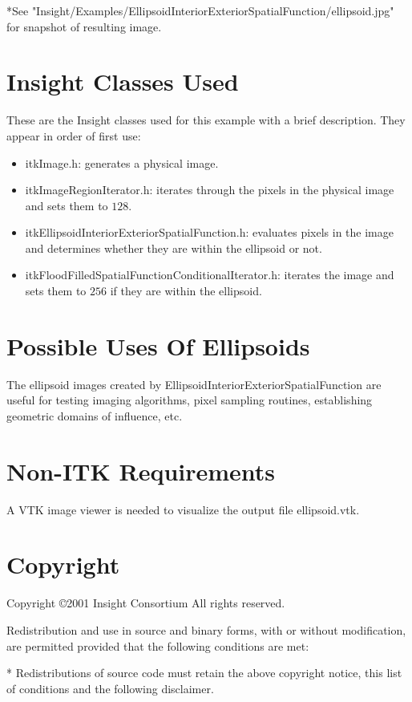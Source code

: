\documentclass{InsightHowto}
\begin{document}
*See "Insight/Examples/EllipsoidInteriorExteriorSpatialFunction/ellipsoid.jpg" for snapshot
of resulting image.

\section{Insight Classes Used}

These are the Insight classes used for this example with a brief description. They appear in
order of first use:

\begin{itemize}
\item itkImage.h: generates a physical image.
\item itkImageRegionIterator.h: iterates through the pixels in the physical image and sets
them to $128$.
\item itkEllipsoidInteriorExteriorSpatialFunction.h: evaluates pixels in the image and determines whether they are within the ellipsoid or
not.
\item itkFloodFilledSpatialFunctionConditionalIterator.h: iterates the image and sets them to $256$ if they are within the
ellipsoid.
\end{itemize}

\section{Possible Uses Of Ellipsoids}
The ellipsoid images created by EllipsoidInteriorExteriorSpatialFunction are useful for
testing imaging algorithms, pixel sampling routines, establishing geometric domains of
influence, etc.

\section{Non-ITK Requirements}
A VTK image viewer is needed to visualize the output file ellipsoid.vtk.

\section{Copyright}
Copyright \copyright 2001 Insight Consortium All rights reserved.

Redistribution and use in source and binary forms, with or without modification, are
permitted provided that the following conditions are met:

 * Redistributions of source code must retain the above copyright notice,
   this list of conditions and the following disclaimer.
\end{document}

